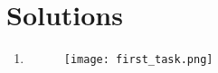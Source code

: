 \documentclass{article}
\begin{document}

\section*{Solutions}
\begin{enumerate}
    \item \begin{figure}[t]
        \centering
        \texttt{[image: first\_task.png]} %
    \end{figure}
\end{enumerate}
\end{document}
